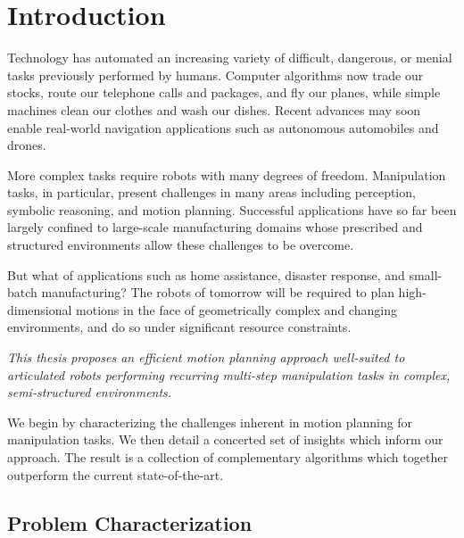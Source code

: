 \chapter{Introduction}
\label{chap:intro}


Technology has automated an increasing variety of
difficult, dangerous, or menial tasks
previously performed by humans.
Computer algorithms now trade our stocks,
route our telephone calls and packages,
and fly our planes,
while simple machines clean our clothes and wash our dishes.
Recent advances may soon enable real-world navigation applications
such as autonomous automobiles and drones.

More complex tasks require robots with many degrees of freedom.
Manipulation tasks, in particular,
present challenges in many areas including
perception, symbolic reasoning, and motion planning.
Successful applications have so far been largely
confined to large-scale manufacturing domains
whose prescribed and structured environments
allow these challenges to be overcome.

But what of applications such as
home assistance, disaster response, and small-batch manufacturing?
The robots of tomorrow will be required to plan
high-dimensional motions
in the face of geometrically complex and changing environments,
and do so under significant resource constraints.


\vspace{0.2cm}
\begin{adjustwidth}{0.2in}{0.1in}
\emph{\large%
This thesis proposes an
efficient motion planning approach
well-suited
to articulated robots
performing recurring multi-step manipulation tasks
in complex, semi-structured environments.
}
\end{adjustwidth}
\vspace{0.2cm}

We begin by characterizing the challenges inherent in
motion planning for manipulation tasks.
We then detail a concerted set of insights which inform our approach.
The result is a collection of complementary algorithms
which together outperform the current state-of-the-art.

\section{Problem Characterization}

